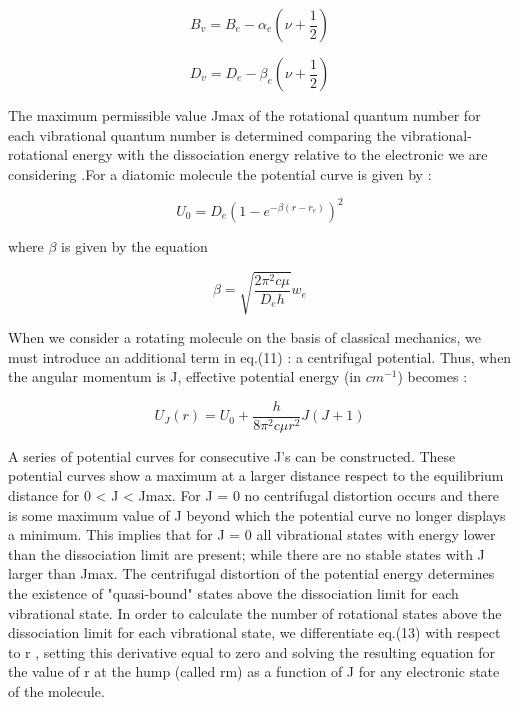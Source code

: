 \documentclass[]{aelab_aiaa-tc}%
\begin{document}
\begin{equation}
B_{v} = B_{e} - \alpha_{e}(\nu + \frac{1}{2})
\end{equation}

\begin{equation}
D_{v} = D_{e} - \beta_{e}(\nu + \frac{1}{2})
\end{equation}

The maximum permissible value Jmax of the rotational quantum number for each vibrational quantum number is determined comparing the vibrational-rotational energy with the dissociation energy relative to the electronic we are considering .For a diatomic molecule the potential curve is given by :

\begin{equation}
U_{0} = D_{e}(1-e^{-\beta(r-r_{e})})^2
\end{equation}

where $\beta$ is given by the equation


\begin{equation}
\beta = \sqrt{\frac{2\pi^2c\mu}{D_{e}h}}w_{e}
\end{equation}

When we consider a rotating molecule on the basis of classical mechanics, we must introduce an additional
term in eq.(11) : a centrifugal potential. Thus, when the angular momentum is J, effective potential energy
(in $cm^{-1}$) becomes :


\begin{equation}
U_{J}(r) = U_{0} + \frac{h}{8\pi^2c\mu r^2}J(J+1)
\end{equation}

A series of potential curves for consecutive J's can be constructed. These potential curves show a maximum at a larger distance respect to the equilibrium distance for 0 < J < Jmax. For J = 0 no centrifugal
distortion occurs and there is some maximum value of J beyond which the potential curve no longer displays a minimum. This implies that for J = 0 all vibrational states with energy lower than the dissociation limit
are present; while there are no stable states with J larger than Jmax.
The centrifugal distortion of the potential energy determines the existence of "quasi-bound" states above the dissociation limit for each vibrational state. In order to calculate the number of rotational states above
the dissociation limit for each vibrational state, we differentiate eq.(13) with respect to r , setting this
derivative equal to zero and solving the resulting equation for the value of r at the hump (called rm) as a function of J for any electronic state of the molecule.
\end{document}
